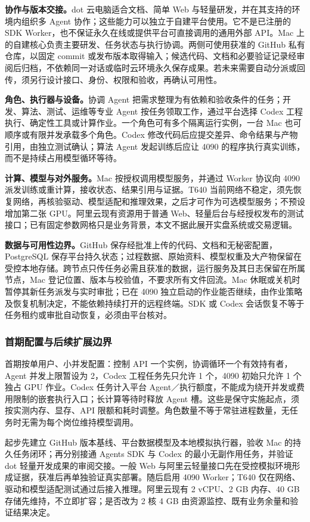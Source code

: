 \documentclass[11pt,a4paper]{article}
\begin{document}
\textbf{协作与版本交接。}dot 云电脑适合文档、简单 Web 与轻量研发，并在其支持的环境内组织多 Agent 协作；这些能力可以独立于自建平台使用。它不是已注册的 SDK Worker，也不保证永久在线或提供平台可直接调用的通用外部 API。Mac 上的自建核心负责主要研发、任务状态与执行协调。两侧可使用获准的 GitHub 私有仓库，以固定 commit 或发布版本取得输入；候选代码、文档和必要验证记录经审阅后归档，不依赖同一对话或临时云环境永久保存成果。若未来需要自动分派或回传，须另行设计接口、身份、权限和验收，再确认可用性。

\textbf{角色、执行器与设备。}协调 Agent 把需求整理为有依赖和验收条件的任务；开发、算法、测试、运维等专业 Agent 按任务领取工作，通过平台选择 Codex 工程执行、确定性工具或计算作业。一个角色可有多个隔离运行实例，一台 Mac 也可顺序或有限并发承载多个角色。Codex 修改代码后应提交差异、命令结果与产物引用，由独立测试确认；算法 Agent 发起训练后应让 4090 的程序执行真实训练，而不是持续占用模型循环等待。

\textbf{计算、模型与对外服务。}Mac 按授权调用模型服务，并通过 Worker 协议向 4090 派发训练或重计算，接收状态、结果引用与证据。T640 当前网络不稳定，须先恢复网络，再核验驱动、模型适配和推理效果，之后才可作为可选模型服务；不预设增加第二张 GPU。阿里云现有资源用于普通 Web、轻量后台与经授权发布的测试接口；已有固定参数网格只是业务背景，本文不据此展开实盘系统或交易逻辑。

\textbf{数据与可用性边界。}GitHub 保存经批准上传的代码、文档和无秘密配置，PostgreSQL 保存平台持久状态；过程数据、原始资料、模型权重及大产物保留在受控本地存储。跨节点只传任务必需且获准的数据，运行服务及其日志保留在所属节点，Mac 登记位置、版本与校验值，不要求所有文件回流。Mac 休眠或关机时暂停其新任务派发与实时审批；已在 4090 独立启动的作业能否继续，由作业策略及恢复机制决定，不能依赖持续打开的远程终端。SDK 或 Codex 会话恢复不等于任务租约或审批自动恢复，必须由平台核对。

\subsubsection{首期配置与后续扩展边界}

首期按单用户、小并发配置：控制 API 一个实例，协调循环一个有效持有者，Agent 并发上限暂设为 2，Codex 工程任务先只允许 1 个，4090 初始只允许 1 个独占 GPU 作业。Codex 任务计入平台 Agent／执行额度，不能成为绕开并发或费用限制的嵌套执行入口；长计算等待时释放 Agent 槽。这些是保守实施起点，须按实测内存、显存、API 限额和耗时调整。角色数量不等于常驻进程数量，无任务时无需为每个岗位维持模型调用。

起步先建立 GitHub 版本基线、平台数据模型及本地模拟执行器，验收 Mac 的持久任务闭环；再分别接通 Agents SDK 与 Codex 的最小无副作用任务，并验证 dot 轻量开发成果的审阅交接。一般 Web 与阿里云轻量接口先在受控模拟环境形成证据，获准后再单独验证真实部署。随后启用 4090 Worker；T640 仅在网络、驱动和模型适配测试通过后接入推理。阿里云现有 2 vCPU、2 GB 内存、40 GB 存储先维持，不立即扩容；是否改为 2 核 4 GB 由资源监控、既有业务余量和验证结果决定。
\end{document}
